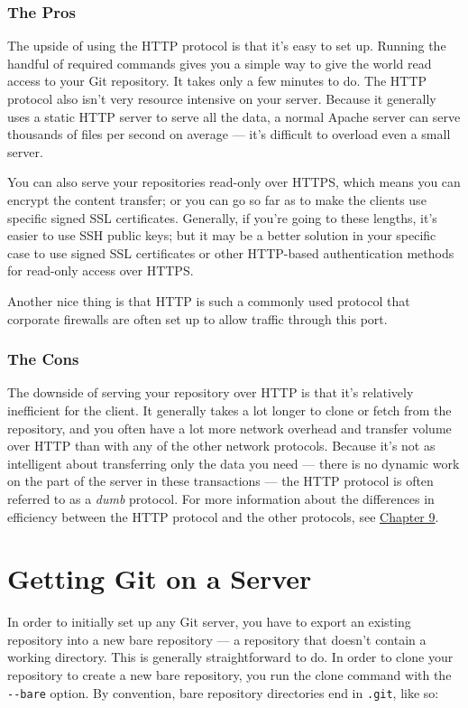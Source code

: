 \documentclass[a4paper]{book}
\newcommand{\prechap}{Chapter }
\newcommand{\postchap}{}
\newcommand{\chapref}[1]{\hyperref[chap:#1]{\prechap #1\postchap}}
\begin{document}
\subsubsection{The Pros}

The upside of using the HTTP protocol is that it's easy to set up. Running the handful of required commands gives you a simple way to give the world read access to your Git repository. It takes only a few minutes to do. The HTTP protocol also isn't very resource intensive on your server. Because it generally uses a static HTTP server to serve all the data, a normal Apache server can serve thousands of files per second on average --- it's difficult to overload even a small server.

You can also serve your repositories read-only over HTTPS, which means you can encrypt the content transfer; or you can go so far as to make the clients use specific signed SSL certificates. Generally, if you're going to these lengths, it's easier to use SSH public keys; but it may be a better solution in your specific case to use signed SSL certificates or other HTTP-based authentication methods for read-only access over HTTPS.

Another nice thing is that HTTP is such a commonly used protocol that corporate firewalls are often set up to allow traffic through this port.

\subsubsection{The Cons}

The downside of serving your repository over HTTP is that it's relatively inefficient for the client. It generally takes a lot longer to clone or fetch from the repository, and you often have a lot more network overhead and transfer volume over HTTP than with any of the other network protocols. Because it's not as intelligent about transferring only the data you need --- there is no dynamic work on the part of the server in these transactions --- the HTTP protocol is often referred to as a \emph{dumb} protocol. For more information about the differences in efficiency between the HTTP protocol and the other protocols, see \chapref{9}.

\section{Getting Git on a Server}

In order to initially set up any Git server, you have to export an existing repository into a new bare repository --- a repository that doesn't contain a working directory. This is generally straightforward to do. In order to clone your repository to create a new bare repository, you run the clone command with the \texttt{-{}-bare} option. By convention, bare repository directories end in \texttt{.git}, like so:
\end{document}
